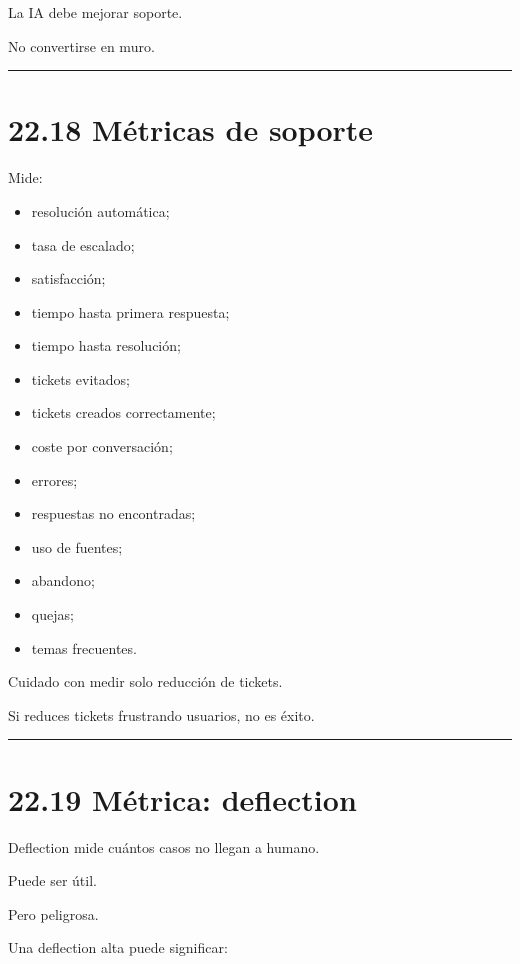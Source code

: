 La IA debe mejorar soporte.

No convertirse en muro.

\begin{center}\rule{0.5\linewidth}{0.5pt}\end{center}

\section{22.18 Métricas de soporte}\label{muxe9tricas-de-soporte}

Mide:

\begin{itemize}
\tightlist
\item
  resolución automática;
\item
  tasa de escalado;
\item
  satisfacción;
\item
  tiempo hasta primera respuesta;
\item
  tiempo hasta resolución;
\item
  tickets evitados;
\item
  tickets creados correctamente;
\item
  coste por conversación;
\item
  errores;
\item
  respuestas no encontradas;
\item
  uso de fuentes;
\item
  abandono;
\item
  quejas;
\item
  temas frecuentes.
\end{itemize}

Cuidado con medir solo reducción de tickets.

Si reduces tickets frustrando usuarios, no es éxito.

\begin{center}\rule{0.5\linewidth}{0.5pt}\end{center}

\section{22.19 Métrica: deflection}\label{muxe9trica-deflection}

Deflection mide cuántos casos no llegan a humano.

Puede ser útil.

Pero peligrosa.

Una deflection alta puede significar:


